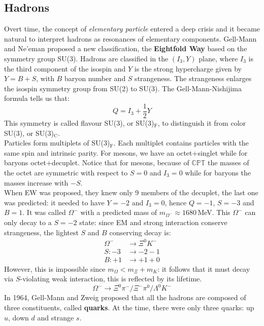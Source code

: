 \documentclass[10.75pt,a4paper,openright,bottom=2cm]{article}
\begin{document}
\subsection{Hadrons}
Overt time, the concept of \textit{elementary particle} entered a deep crisis and it became natural to interpret hadrons as resonances of elementary components. Gell-Mann and Ne'eman proposed a new classification, the \textbf{Eightfold Way} based on the symmetry group SU(3). Hadrons are classified in the $(I_3,Y)$ plane, where $I_3$ is the third component of the isospin and $Y$ is the strong hypercharge given by $Y=B+S$, with $B$ baryon number and $S$ strangeness. The strangeness enlarges the isospin symmetry group from SU(2) to SU(3). The Gell-Mann-Nishijima formula tells us that:
\[
Q=I_3+\frac{1}{2}Y
\]
This symmetry is called flavour SU(3), or SU(3)$_\text{F}$, to distinguish it from color SU(3), or SU(3)$_\text{C}$.\\
Particles form multiplets of SU(3)$_\text{F}$. Each multiplet contains particles with the same spin and intrinsic parity. For mesons, we have an octet+singlet while for baryons octet+decuplet. Notice that for mesons, because of $\mathbb{CPT}$ the masses of the octet are symmetric with respect to $S=0$ and $I_3=0$ while for baryons the masses increase with $-S$.\\
When EW was proposed, they knew only 9 members of the decuplet, the last one was predicted: it needed to have $Y=-2$ and $I_3=0$, hence $Q=-1$, $S=-3$ and $B=1$. It was called $\Omega^-$ with a predicted mass of $m_{\Omega^-}\approx1680$\,MeV. This $\Omega^-$ can only decay to a $S=-2$ state: since EM and strong interaction conserve strangeness, the lightest $S$ and $B$ conserving decay is:
\begin{align*}
\Omega^-&\to\Xi^0K^-\\
S:-3&\to-2-1\\
B:+1&\to+1+0
\end{align*}
However, this is impossible since $m_\Omega<m_\Xi+m_K$: it follows that it must decay via $S$-violating weak interaction, this is reflected by its lifetime. 
\[
\Omega^-\to\Xi^0\pi^-/\Xi^-\pi^0/\Lambda^0K^-
\]
In 1964, Gell-Mann and Zweig proposed that all the hadrons are composed of three constituents, called \textbf{quarks}. At the time, there were only three quarks: up $u$, down $d$ and strange $s$.
\end{document}
